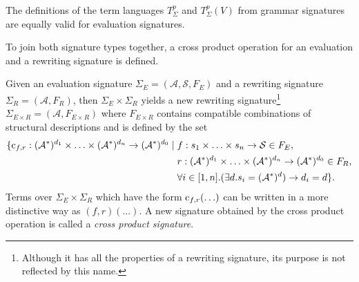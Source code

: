\documentclass[
    a4paper,
    12pt,
    twoside,
    BCOR=12mm,
    parskip=half,
    chapterprefix,
    numbers=noenddot,
    bibliography=totoc
]{scrbook}
\begin{document}
The definitions of the term languages $T^p_\Sigma$ and $T^p_\Sigma(V)$ from grammar signatures are equally valid for evaluation signatures.

To join both signature types together, a cross product operation for an evaluation and a rewriting signature is defined.

Given an evaluation signature $\Sigma_E=(\mathcal{A},\mathcal{S},F_E)$ and a rewriting signature $\Sigma_R=(\mathcal{A},F_R)$, then $\Sigma_E \times \Sigma_R$ yields a new rewriting signature\footnote{Although it has all the properties of a rewriting signature, its purpose is not reflected by this name.} $\Sigma_{E \times R}=(\mathcal{A},F_{E \times R})$ where $F_{E \times R}$ contains compatible combinations of structural descriptions and is defined by the set
\begin{equation*}
	\{ \mathrm{c}_{f,r} : (\mathcal{A}^*)^{d_1} \times \ldots \times (\mathcal{A}^*)^{d_n} \to (\mathcal{A}^*)^{d_0} \mid
	\begin{aligned}[t]
		&f : s_1 \times \ldots \times s_n \to \mathcal{S} \in F_E,\\
		&r : (\mathcal{A}^*)^{d_1} \times \ldots \times (\mathcal{A}^*)^{d_n} \to (\mathcal{A}^*)^{d_0} \in F_R,\\
		&\forall i \in [1,n].(\exists d .s_i = (\mathcal{A}^*)^d) \to d_i = d \}.
	\end{aligned}
\end{equation*}
Terms over $\Sigma_E \times \Sigma_R$ which have the form $\mathrm{c}_{f,r}(\ldots)$ can be written in a more distinctive way as $(f,r)(\ldots)$. A new signature obtained by the cross product operation is called a \emph{cross product signature}.
\end{document}
